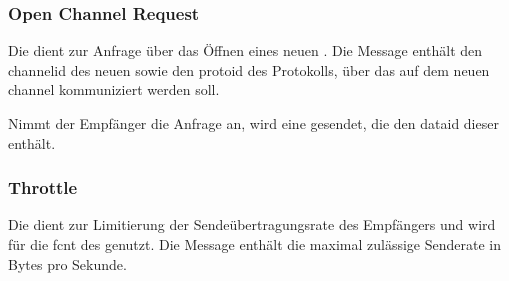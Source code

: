 \bmcpchblockstatrepbytefield


\subsubsection*{Open Channel Request}
\label{dcl-bmcp-openchreq}
Die \msg{\bmcpopenchreq} dient zur Anfrage über das Öffnen eines neuen
.
Die Message enthält den \gls{channelid} des neuen 
sowie den \gls{protoid} des Protokolls, über das auf dem neuen \gls{channel}
kommuniziert werden soll.

Nimmt der Empfänger die Anfrage an, wird eine \msg{\bmcpack} gesendet, die den
\gls{dataid} dieser \msg{\bmcpopenchreq} enthält.



\subsubsection*{Throttle}
\label{dcl-bmcp-throttle}
Die \msg{\bmcpthrottle} dient zur Limitierung der Sendeübertragungsrate des
Empfängers und wird für die \gls{fcnt} des  genutzt.
Die Message enthält die maximal zulässige Senderate in Bytes pro Sekunde.

